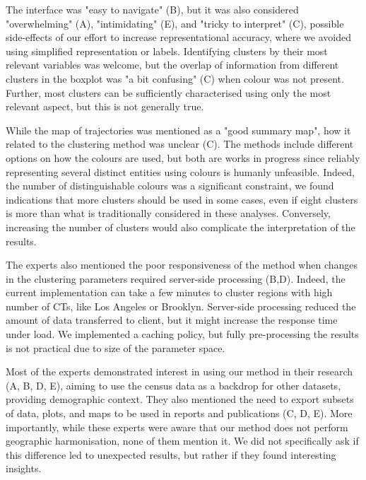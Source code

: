 The interface was "easy to navigate" (B), but it was also considered
"overwhelming" (A), "intimidating" (E), and "tricky to interpret" (C), possible
side-effects of our effort to increase  representational accuracy, where we
avoided using simplified representation or labels. Identifying clusters by their
most relevant variables was welcome, but the overlap of information from
different clusters in the boxplot was "a bit confusing" (C) when colour was not
present. Further, most clusters can be sufficiently characterised using only the
most relevant aspect, but this is not generally true. 


While the map of trajectories was mentioned as a "good summary map", how it
related to the clustering method was unclear (C). The methods include different
options on how the colours are used, but both are works in progress since reliably
representing several distinct entities using colours is humanly unfeasible.
Indeed, the number of distinguishable colours was a significant constraint, we
found indications that more clusters should be used in some cases, even if eight
clusters is more than what is traditionally considered in these analyses.
Conversely, increasing the number of clusters would also complicate the
interpretation of the results.


The experts also mentioned the poor responsiveness of the method when changes in
the clustering parameters required server-side processing (B,D). Indeed, the
current implementation can take a few minutes to cluster regions with high
number of CTs, like Los Angeles or Brooklyn. Server-side processing reduced the
amount of data transferred to client, but it might increase the response time
under load. We implemented a caching policy, but fully pre-processing the
results is not practical due to size of the parameter space.

Most of the experts demonstrated interest in using our method in their research
(A, B, D, E), aiming to use the census data as a backdrop for other datasets,
providing demographic context. They also mentioned the need to export subsets of
data, plots, and maps to be used in reports and publications (C, D, E). More
importantly, while these experts were aware that our method does not perform
geographic harmonisation, none of them mention it. We did not specifically ask
if this difference led to unexpected results, but rather if they found
interesting insights. 
